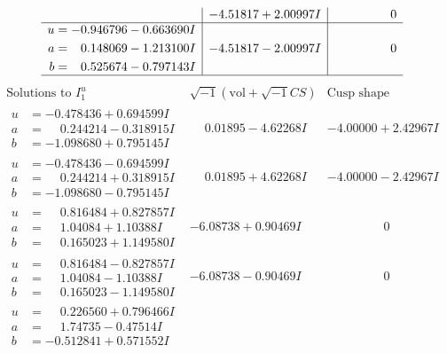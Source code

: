 \documentclass[1p]{elsarticle_modified}
\theoremstyle{definition}
\newcommand{\I}{\sqrt{-1}}
\begin{document}
$$\begin{array}{c|c|c}
 & -4.51817 + 2.00997 I & \phantom{-0.000000 } 0 \\ \hline\begin{aligned}
u &= -0.946796 - 0.663690 I \\
a &= \phantom{-}0.148069 - 1.213100 I \\
b &= \phantom{-}0.525674 - 0.797143 I\end{aligned}
 & -4.51817 - 2.00997 I & \phantom{-0.000000 } 0\\
 \hline 
 \end{array}$$\newpage$$\begin{array}{c|c|c}  
\text{Solutions to }I^u_{1}& \I (\text{vol} + \sqrt{-1}CS) & \text{Cusp shape}\\
 \hline 
\begin{aligned}
u &= -0.478436 + 0.694599 I \\
a &= \phantom{-}0.244214 - 0.318915 I \\
b &= -1.098680 + 0.795145 I\end{aligned}
 & \phantom{-}0.01895 - 4.62268 I & -4.00000 + 2.42967 I \\ \hline\begin{aligned}
u &= -0.478436 - 0.694599 I \\
a &= \phantom{-}0.244214 + 0.318915 I \\
b &= -1.098680 - 0.795145 I\end{aligned}
 & \phantom{-}0.01895 + 4.62268 I & -4.00000 - 2.42967 I \\ \hline\begin{aligned}
u &= \phantom{-}0.816484 + 0.827857 I \\
a &= \phantom{-}1.04084 + 1.10388 I \\
b &= \phantom{-}0.165023 + 1.149580 I\end{aligned}
 & -6.08738 + 0.90469 I & \phantom{-0.000000 } 0 \\ \hline\begin{aligned}
u &= \phantom{-}0.816484 - 0.827857 I \\
a &= \phantom{-}1.04084 - 1.10388 I \\
b &= \phantom{-}0.165023 - 1.149580 I\end{aligned}
 & -6.08738 - 0.90469 I & \phantom{-0.000000 } 0 \\ \hline\begin{aligned}
u &= \phantom{-}0.226560 + 0.796466 I \\
a &= \phantom{-}1.74735 - 0.47514 I \\
b &= -0.512841 + 0.571552 I\end{aligned}

\end{array}$$
\end{document}
